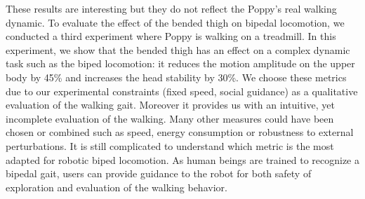 These results are interesting but they do not reflect the Poppy’s real walking dynamic. To evaluate the effect of the bended thigh on bipedal locomotion, we conducted a third experiment where Poppy is walking on a treadmill. In this experiment, we show that the bended thigh has an effect on a complex dynamic task such as the biped locomotion: it reduces the motion amplitude on the upper body  by 45\% and increases the head stability by 30\%. We choose these metrics due to our experimental constraints (fixed speed, social guidance) as a qualitative evaluation of the walking gait. Moreover it provides us with an intuitive, yet incomplete evaluation of the walking. Many other measures could have been chosen or combined such as speed, energy consumption or robustness to external perturbations. It is still complicated to understand which metric is the most adapted for robotic biped locomotion. As human beings are trained to recognize a bipedal gait, users can provide guidance to the robot for both safety of exploration and evaluation of the walking behavior.



